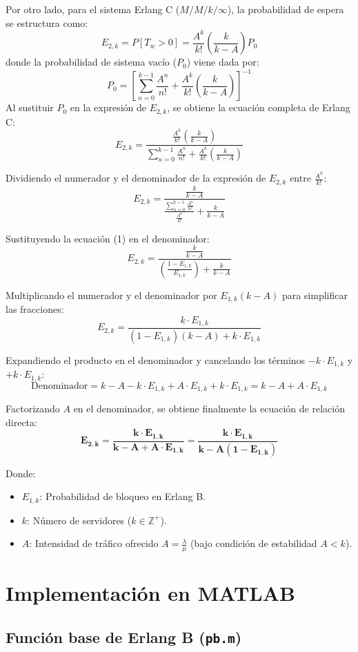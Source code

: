 \documentclass[11pt, a4paper]{article}
\begin{document}
Por otro lado, para el sistema Erlang C ($M/M/k/\infty$), la probabilidad de espera se estructura como:
\[
E_{2,k} = P[T_w > 0] = \frac{A^k}{k!} \left( \frac{k}{k - A} \right) P_0
\]
donde la probabilidad de sistema vacío ($P_0$) viene dada por:
\[
P_0 = \left[ \sum\limits_{n=0}^{k-1} \frac{A^n}{n!} + \frac{A^k}{k!} \left( \frac{k}{k - A} \right) \right]^{-1}
\]
Al sustituir $P_0$ en la expresión de $E_{2,k}$, se obtiene la ecuación completa de Erlang C:
\[
E_{2,k} = \frac{\frac{A^k}{k!} \left(\frac{k}{k - A}\right)}{\sum\limits_{n=0}^{k-1} \frac{A^n}{n!} + \frac{A^k}{k!} \left(\frac{k}{k - A}\right)}
\]


Dividiendo el numerador y el denominador de la expresión de $E_{2,k}$ entre $\frac{A^k}{k!}$:
\[
E_{2,k} = \frac{\frac{k}{k - A}}{\frac{\sum\limits_{n=0}^{k-1} \frac{A^n}{n!}}{\frac{A^k}{k!}} + \frac{k}{k - A}}
\]

Sustituyendo la ecuación (1) en el denominador:
\[
E_{2,k} = \frac{\frac{k}{k - A}}{\left(\frac{1 - E_{1,k}}{E_{1,k}}\right) + \frac{k}{k - A}}
\]

Multiplicando el numerador y el denominador por $E_{1,k}(k - A)$ para simplificar las fracciones:
\[
E_{2,k} = \frac{k \cdot E_{1,k}}{(1 - E_{1,k})(k - A) + k \cdot E_{1,k}}
\]

Expandiendo el producto en el denominador y cancelando los términos $-k \cdot E_{1,k}$ y $+k \cdot E_{1,k}$:
\[
\text{Denominador} = k - A - k \cdot E_{1,k} + A \cdot E_{1,k} + k \cdot E_{1,k} = k - A + A \cdot E_{1,k}
\]

Factorizando $A$ en el denominador, se obtiene finalmente la ecuación de relación directa:
\[
\mathbf{E_{2,k} = \frac{k \cdot E_{1,k}}{k - A + A \cdot E_{1,k}} = \frac{k \cdot E_{1,k}}{k - A(1 - E_{1,k})}}
\]

Donde:
\begin{itemize}
    \item $E_{1,k}$: Probabilidad de bloqueo en Erlang B.
    \item $k$: Número de servidores ($k \in \mathbb{Z}^+$).
    \item $A$: Intensidad de tráfico ofrecido $A = \frac{\lambda}{\mu}$ (bajo condición de estabilidad $A < k$).
\end{itemize}

\section{Implementación en MATLAB}

\subsection{Función base de Erlang B (\texttt{pb.m})}
\end{document}
